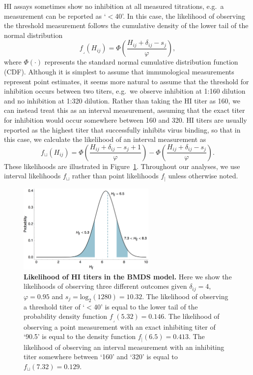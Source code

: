 \documentclass[11pt,oneside,letterpaper]{article}
\newcommand{\se}{s}									%
\newcommand{\point}{f_{\scriptscriptstyle \vert}}	%
\newcommand{\threshold}{f_{\textstyle \lrcorner}}	%
\newcommand{\interval}{f_{\sqcup}}					%
\newcommand{\mdssd}{\varphi}						%
\begin{document}
HI assays sometimes show no inhibition at all measured titrations, e.g.\ a measurement can be reported as `$<$40'.
In this case, the likelihood of observing the threshold measurement follows the cumulative density of the lower tail of the normal distribution
\begin{equation} 
	\threshold(H_{ij}) = \Phi \left( \frac{ H_{ij} + \delta_{ij} - \se_j }{ \mdssd } \right),
\end{equation}
where $\Phi(\cdot)$ represents the standard normal cumulative distribution function (CDF).
Although it is simplest to assume that immunological measurements represent point estimates, it seems more natural to assume that the threshold for inhibition occurs between two titers, e.g.\ we observe inhibition at 1:160 dilution and no inhibition at 1:320 dilution.
Rather than taking the HI titer as 160, we can instead treat this as an interval measurement, assuming that the exact titer for inhibition would occur somewhere between 160 and 320.
HI titers are usually reported as the highest titer that successfully inhibits virus binding, so that in this case, we calculate the likelihood of an interval measurement as
\begin{equation} 
	\interval(H_{ij}) = \Phi \left( \frac{ H_{ij} + \delta_{ij} - \se_j + 1 }{ \mdssd } \right) - \Phi \left( \frac{ H_{ij} + \delta_{ij} - \se_j }{\mdssd} \right).
\end{equation}
These likelihoods are illustrated in Figure~\ref{hij_likelihood}.
Throughout our analyses, we use interval likelihoods $\interval$ rather than point likelihoods $\point$ unless otherwise noted.

\begin{figure}[tb]
	\centering		
	\includegraphics[width=0.6\textwidth]{figures/hij_likelihood}
	\caption{\textbf{Likelihood of HI titers in the BMDS model.} 
	Here we show the likelihoods of observing three different outcomes given $\delta_{ij} = 4$, $\mdssd = 0.95$ and $\se_j = \mathrm{log}_2 (1280) = 10.32$.  
	The likelihood of observing a threshold titer of `$<$40' is equal to the lower tail of the probability density function $\threshold(5.32) = 0.146$.
	The likelihood of observing a point measurement with an exact inhibiting titer of `90.5' is equal to the density function $\point(6.5) = 0.413$.
	The likelihood of observing an interval measurement with an inhibiting titer somewhere between `160' and `320' is equal to $\interval(7.32) = 0.129.$
	} 
	\label{hij_likelihood} 
\end{figure}
\end{document}
